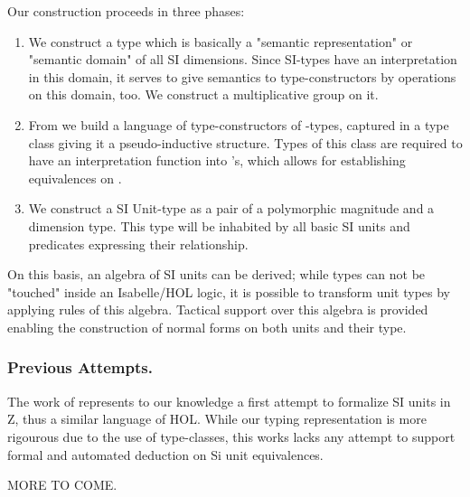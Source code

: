 \documentclass[11pt,a4paper]{book}
\begin{document}

Our construction proceeds in three phases:
\begin{enumerate}%
\item We construct a type  which is basically a "semantic representation" or
"semantic domain" of all SI dimensions. Since SI-types have an interpretation in this domain,
it serves to give semantics to type-constructors by operations on this domain, too.
We construct a multiplicative group on it.

\item From  we build a language of type-constructors of -types, 
 captured in a type class  giving it a pseudo-inductive structure. Types of
 this class are required to have  an interpretation function into 's, which
 allows for establishing equivalences on .
      
\item We construct a SI Unit-type as a pair of a polymorphic magnitude and a dimension type.
  This type will be inhabited by all basic SI units and predicates expressing their relationship.
\end{enumerate}%

On this basis, an algebra of SI units can be derived; while types can not be "touched" inside
an Isabelle/HOL logic, it is possible to transform unit types by applying rules of this algebra.
Tactical support over this algebra is provided enabling the construction of normal forms on 
both units and their type.  

\subsubsection{Previous Attempts.} The work of \cite{HayesBrendan95} represents to our knowledge a
first attempt to formalize SI units in Z, thus a similar language of HOL. While our typing
representation is more rigourous due to the use of type-classes, this works lacks any attempt
to support formal and automated deduction on Si unit equivalences.

MORE TO COME.





\end{document}
